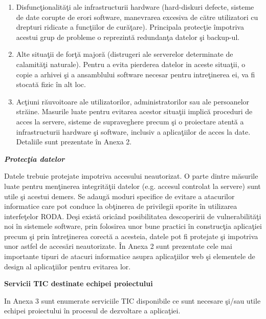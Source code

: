 \documentclass[a4paper]{article}
\newcommand\liststyleLSi{%
\renewcommand\theenumi{\arabic{enumi}}
\renewcommand\theenumii{\arabic{enumii}}
\renewcommand\theenumiii{\arabic{enumiii}}
\renewcommand\theenumiv{\arabic{enumiv}}
\renewcommand\labelenumi{\theenumi.}
\renewcommand\labelenumii{\theenumii.}
\renewcommand\labelenumiii{\theenumiii.}
\renewcommand\labelenumiv{\theenumiv.}
}
\begin{document}
{\liststyleLSi
\begin{enumerate}
\item {
Disfunc\c{t}ionalit\u{a}\c{t}i ale infrastructurii hardware (hard-diskuri defecte, sisteme de date corupte de erori
software, manevrarea excesiva de c\u{a}tre utilizatori cu drepturi ridicate a func\c{t}iilor de cur\u{a}\c{t}are).
Principala protec\c{t}ie \^impotriva acestui grup de probleme o reprezint\u{a} redundan\c{t}a datelor \c{s}i
backup-ul.}
\item {
Alte situa\c{t}ii de for\c{t}\u{a} major\u{a} (distrugeri ale serverelor determinate de calamit\u{a}\c{t}i naturale).
Pentru a evita pierderea datelor in aceste situa\c{t}ii, o copie a arhivei \c{s}i a ansamblului software necesar
pentru intre\c{t}inerea ei, va fi stocat\u{a} fizic \^in alt loc.}
\item {
Ac\c{t}iuni r\u{a}uvoitoare ale utilizatorilor, administratorilor sau ale persoanelor str\u{a}ine. Masurile luate
pentru evitarea acestor situa\c{t}ii implic\u{a} proceduri de acces la servere, sisteme de supraveghere precum \c{s}i
o proiectare atent\u{a} a infrastructurii hardware \c{s}i software, inclusiv a aplica\c{t}iilor de acces la date.
Detaliile sunt prezentate \^in Anexa 2.}
\end{enumerate}
{\bfseries\itshape\color[rgb]{0.0,0.0,0.039215688}
Protec\c{t}ia datelor}

{
Datele trebuie protejate impotriva accesului neautorizat. O parte dintre m\u{a}surile luate pentru men\c{t}inerea
integrit\u{a}\c{t}ii datelor (e.g. accesul controlat la servere) sunt utile \c{s}i acestui demers. Se adaug\u{a}
moduri specifice de evitare a atacurilor informatice care pot conduce la ob\c{t}inerea de privilegii sporite \^in
utilizarea interfe\c{t}elor RODA. De\c{s}i exist\u{a} oric\^and posibilitatea descoperirii de
vulnerabilit\u{a}\c{t}i noi \^in sistemele software, prin folosirea unor bune practici \^in construc\c{t}ia
aplica\c{t}iei precum \c{s}i prin \^intre\c{t}inerea corect\u{a} a acesteia, datele pot fi protejate \c{s}i
impotriva unor astfel de acces\u{a}ri neautorizate. \^In Anexa 2 sunt prezentate cele mai importante tipuri de atacuri
informatice asupra aplica\c{t}iilor web \c{s}i elementele de design al aplica\c{t}iilor pentru evitarea lor.}

{\bfseries\color[rgb]{0.0,0.0,0.039215688}
Servicii TIC destinate echipei proiectului}

{
In Anexa 3 sunt enumerate serviciile TIC disponibile ce sunt necesare \c{s}i/sau utile echipei proiectului \^in
procesul de dezvoltare a aplica\c{t}iei.}

}
\end{document}
